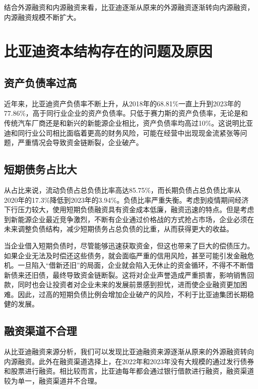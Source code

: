 结合外源融资和内源融资来看，比亚迪逐渐从原来的外源融资逐渐转向内源融资，内源融资规模不断扩大。
\section{比亚迪资本结构存在的问题及原因}

\subsection{资产负债率过高}
近年来，比亚迪资产负债率不断上升，从2018年的68.81\%一直上升到2023年的77.86\%，高于同行业企业的资产负债率。只低于赛力斯的资产负债率，无论是和传统汽车厂商还是和新兴的新能源企业相比，资产负债率均高过10\%。这说明比亚迪和同行业公司相比面临着更高的财务风险，可能在经营中出现现金流紧张等问题，严重情况会导致资金链断裂，企业破产。
\subsection{短期债务占比大}
从占比来说，流动负债占总负债比率高达85.75\%，而长期负债占总负债比率从2020年的17.3\%降低到2023年的3.94\%。负债比率严重失衡。考虑到疫情期间经济下行压力较大，使用短期负债融资具有资金成本低廉，融资迅速的特点。但是考虑到新能源企业最近竞争激烈，不断有企业通过价格战的方式抢占市场，企业必须在未来调整负债结构，减少短期债务占总负债的比重，从而获得更大的收益。

当企业借入短期负债时，尽管能够迅速获取资金，但这也带来了巨大的偿债压力。如果企业无法及时偿还这些债务，就会面临严重的信用风险，甚至可能引发金融危机。一旦陷入“借新还旧”的局面，企业就会陷入无休止的资金循环，不得不不断借新债来还旧债，最终导致资金链断裂。这将对企业声誉造成严重损害，影响销售回款，同时也会让投资者对企业未来的发展前景感到担忧，进而使企业融资更加困难。因此，过高的短期负债比例会增加企业破产的风险，不利于比亚迪集团长期稳健的发展。
\subsection{融资渠道不合理}
从比亚迪融资来源分析，我们可以发现比亚迪融资来源逐渐从原来的外源融资转向内源融资。此外在融资渠道选择上，在2022年和2023年没有大规模的通过发行债券和股票进行融资。相比较而言，比亚迪每年都会通过银行借款进行融资，融资渠道较为单一，融资渠道并不合理。 


